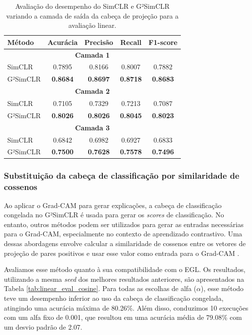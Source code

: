 \begin{table}[h]
  \centering
  \caption{Avaliação do desempenho do SimCLR e G²SimCLR variando a camada de saída da cabeça de projeção para a avaliação linear.}
  \label{tab:linear_eval_projection_layers}
  \setlength{\tabcolsep}{6pt}
  \begin{tabular}{lcccc}
    \toprule
    Método & Acurácia & Precisão & Recall & F1-score \\
    \midrule
    \multicolumn{5}{c}{\textbf{Camada 1}} \\
    \midrule
    SimCLR   & 0.7895 & 0.8166 & 0.8007 & 0.7882 \\
    G²SimCLR & \textbf{0.8684} & \textbf{0.8697} & \textbf{0.8718} & \textbf{0.8683} \\
    \midrule
    \multicolumn{5}{c}{\textbf{Camada 2}} \\
    \midrule
    SimCLR   & 0.7105 & 0.7329 & 0.7213 & 0.7087 \\
    G²SimCLR & \textbf{0.8026} & \textbf{0.8026} & \textbf{0.8045} & \textbf{0.8023} \\
    \midrule
    \multicolumn{5}{c}{\textbf{Camada 3}} \\
    \midrule
    SimCLR   & 0.6842 & 0.6982 & 0.6927 & 0.6833 \\
    G²SimCLR & \textbf{0.7500} & \textbf{0.7628} & \textbf{0.7578} & \textbf{0.7496} \\
    \bottomrule
  \end{tabular}
\end{table}


\subsubsection{Substituição da cabeça de classificação por similaridade de cossenos}

Ao aplicar o Grad-CAM para gerar explicações, a cabeça de classificação congelada no G²SimCLR é usada para gerar os \textit{scores} de classificação. No entanto, outros métodos podem ser utilizados para gerar as entradas necessárias para o Grad-CAM, especialmente no contexto de aprendizado contrastivo. Uma dessas abordagens envolve calcular a similaridade de cossenos entre os vetores de projeção de pares positivos e usar esse valor como entrada para o Grad-CAM \cite{sammani2023visualizing}.

Avaliamos esse método quanto à sua compatibilidade com o EGL. Os resultados, utilizando a mesma \textit{seed} dos melhores resultados anteriores, são apresentados na Tabela \ref{tab:linear_eval_cosine}. Para todas as escolhas de alfa ($\alpha$), esse método teve um desempenho inferior ao uso da cabeça de classificação congelada, atingindo uma acurácia máxima de 80.26\%. Além disso, conduzimos 10 execuções com um alfa fixo de 0.001, que resultou em uma acurácia média de 79.08\% com um desvio padrão de 2.07.

